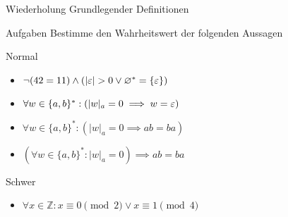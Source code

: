 
{
\begin{frame}[fragile]{Wiederholung Grundlegender Definitionen}
    \begin{alertblock}{Aufgaben}
        Bestimme den Wahrheitswert der folgenden Aussagen
    \end{alertblock}
    \begin{block}{Normal}
        \begin{itemize}
            \item $\neg (42 = 11) \wedge (|\varepsilon| > 0 \vee \varnothing^* = \{\varepsilon\})$
            \item $\forall w \in \{a, b\}^*: (|w|_a = 0 \implies w = \varepsilon)$
            \item $\forall w \in \{a, b\}^*: (|w|_a = 0 \implies ab = ba)$
            \item $(\forall w \in \{a, b\}^*: |w|_a = 0) \implies ab = ba$
        \end{itemize}
    \end{block}
    \begin{block}{Schwer}
        \begin{itemize}
            \item $\forall x \in \mathbb{Z}: x \equiv 0 \pmod{2} \vee x \equiv 1 \pmod{4}$
        \end{itemize}
    \end{block}
\end{frame}
}

